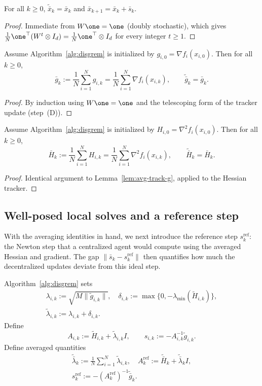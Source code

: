 \documentclass[review,onefignum,onetabnum]{siamart171218}
\begin{document}
	\begin{lemma}\label{lem:avg-pres}
		For all $k\ge0$, $\tilde{\bar x}_k=\bar x_k$ and $\bar x_{k+1}=\bar x_k+\bar s_k$.
	\end{lemma}
	\begin{proof}
		Immediate from $W\one=\one$ (doubly stochastic),
		which gives $\frac1N\one^\top(W^t\otimes I_d)=\frac1N\one^\top\otimes I_d$
		for every integer $t\ge 1$.
	\end{proof}
	
	\begin{lemma}\label{lem:avg-track-g}
		Assume Algorithm~\ref{alg:disgrem} is initialized by $g_{i,0}=\nabla f_i(x_{i,0})$.
		Then for all $k\ge0$,
		\[
		\bar g_k:=\frac1N\sum_{i=1}^N g_{i,k}=\frac1N\sum_{i=1}^N\nabla f_i(x_{i,k}),
		\qquad
		\tilde{\bar g}_k=\bar g_k.
		\]
	\end{lemma}
	\begin{proof}
		By induction using $W\one=\one$ and the telescoping form of the tracker update (step~(D)).
	\end{proof}
	
	\begin{lemma}\label{lem:avg-track-h}
		Assume Algorithm~\ref{alg:disgrem} is initialized by $H_{i,0}=\nabla^2 f_i(x_{i,0})$.
		Then for all $k\ge0$,
		\[
		\bar H_k:=\frac1N\sum_{i=1}^N H_{i,k}=\frac1N\sum_{i=1}^N\nabla^2 f_i(x_{i,k}),
		\qquad
		\tilde{\bar H}_k=\bar H_k.
		\]
	\end{lemma}
	\begin{proof}
		Identical argument to Lemma~\ref{lem:avg-track-g}, applied to the Hessian tracker.
	\end{proof}
	
	\subsection{Well-posed local solves and a reference step}\label{ssec:refstep}
	With the averaging identities in hand, we next introduce the
	reference step $s_k^{\mathrm{ref}}$: the Newton step that a
	centralized agent would compute using the averaged Hessian and gradient.
	The gap $\|\bar s_k - s_k^{\mathrm{ref}}\|$ then quantifies how much the
	decentralized updates deviate from this ideal step.
	
	Algorithm~\ref{alg:disgrem} sets
	\begin{gather*}
		\lambda_{i,k}:=\sqrt{M\|\tilde g_{i,k}\|},\quad
		\delta_{i,k}:=\max\{0,-\lambda_{\min}(\tilde H_{i,k})\},\\
		\tilde\lambda_{i,k}:=\lambda_{i,k}+\delta_{i,k}.
	\end{gather*}
	Define
	\[
	A_{i,k}:=\tilde H_{i,k}+\tilde\lambda_{i,k}I,
	\qquad
	s_{i,k}:=-A_{i,k}^{-1}\tilde g_{i,k}.
	\]
	Define averaged quantities
	\begin{gather*}
		\tilde{\bar\lambda}_k:=\tfrac1N\textstyle\sum_{i=1}^N \tilde\lambda_{i,k},\quad
		A_k^{\mathrm{ref}}:=\tilde{\bar H}_k+\tilde{\bar\lambda}_k I,\\
		s_k^{\mathrm{ref}}:=-(A_k^{\mathrm{ref}})^{-1}\tilde{\bar g}_k.
	\end{gather*}
	
\end{document}
